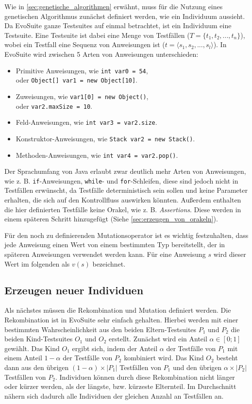 \documentclass[a4paper,11pt]{article}
\begin{document}
Wie in \cref{sec:genetische_algorithmen} erwähnt, muss für die Nutzung eines genetischen Algorithmus zunächst definiert werden, wie ein Individuum aussieht.
Da EvoSuite ganze Testsuites auf einmal betrachtet, ist ein Individuum eine Testsuite.
Eine Testsuite ist dabei eine Menge von Testfällen ($T = \{t_1, t_2, ..., t_n\}$), wobei ein Testfall eine Sequenz von Anweisungen ist ($t = \langle s_1, s_2, ..., s_l \rangle$).
In EvoSuite wird zwischen 5 Arten von Anweisungen unterschieden:
\begin{itemize}
	\item Primitive Anweisungen, wie \lstinline{int var0 = 54},\\
	oder \lstinline{Object[] var1 = new Object[10]}.
	\item Zuweisungen, wie \lstinline{var1[0] = new Object()},\\
	oder \lstinline{var2.maxSize = 10}.
	\item Feld-Anweisungen, wie \lstinline{int var3 = var2.size}.
	\item Konstruktor-Anweisungen, wie \lstinline{Stack var2 = new Stack()}.
	\item Methoden-Anweisungen, wie \lstinline{int var4 = var2.pop()}.
\end{itemize}
Der Sprachumfang von Java erlaubt zwar deutlich mehr Arten von Anweisungen, wie z. B. \lstinline{if}-Anweisungen, \lstinline{while}- und \lstinline{for}-Schleifen, diese sind jedoch nicht in Testfällen erwünscht, da Testfälle deterministisch sein sollen und keine Parameter erhalten, die sich auf den Kontrollfluss auswirken könnten.
Außerdem enthalten die hier definierten Testfälle keine Orakel, wie z. B. \textit{Assertions}.
Diese werden in einem späteren Schritt hinzugefügt (Siehe \cref{sec:erzeugen_von_orakeln}).

Für den noch zu definierenden Mutationsoperator ist es wichtig festzuhalten, dass jede Anweisung einen Wert von einem bestimmten Typ bereitstellt, der in späteren Anweisungen verwendet werden kann.
Für eine Anweisung $s$ wird dieser Wert im folgenden als $v(s)$ bezeichnet.

\subsection{Erzeugen neuer Individuen}

Als nächstes müssen die Rekombination und Mutation definiert werden.
Die Rekombination ist in EvoSuite sehr einfach gehalten.
Hierbei werden mit einer bestimmten Wahrscheinlichkeit aus den beiden Eltern-Testsuites $P_1$ und $P_2$ die beiden Kind-Testsuites $O_1$ und $O_2$ erstellt.
Zunächst wird ein Anteil $\alpha \in [0;1]$ gewählt.
Das Kind $O_1$ ergibt sich, indem der Anteil $\alpha$ der Testfälle von $P_1$ mit einem Anteil $1 - \alpha$ der Testfälle von $P_2$ kombiniert wird.
Das Kind $O_2$ besteht dann aus den übrigen $(1 - \alpha) \times |P_1|$ Testfällen von $P_1$ und den übrigen $\alpha \times |P_2|$ Testfällen von $P_2$.
Individuen können durch diese Rekombination nicht länger oder kürzer werden, als der längste, bzw. kürzeste Elternteil.
Im Durchschnitt nähern sich dadurch alle Individuen der gleichen Anzahl an Testfällen an.
\end{document}
